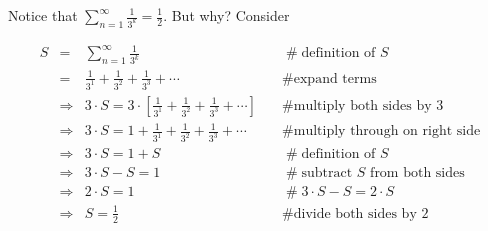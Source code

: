\documentclass[11pt, oneside]{article}   	%
\begin{document}
Notice that  $\sum\limits_{n = 1}^\infty   \frac{1}{3^k}  = \frac{1}{2}$. But why? Consider 
      
\begin{equation*}
\begin{array}{lllll}
S
&=&   \sum\limits_{n = 1}^\infty   \frac{1}{3^k}                                                                     &\quad  \mathrel{\#} \text{definition of $S$}                    \\ 
&=& \frac{1}{3^1} + \frac{1}{3^2} + \frac{1}{3^3} + \cdots                                                       &\quad  \mathrel{\#} \text{expand terms}                         \\
&\Rightarrow& 3 \cdot S = 3 \cdot [\frac{1}{3^1} + \frac{1}{3^2} + \frac{1}{3^3} + \cdots ]      &\quad  \mathrel{\#} \text{multiply both sides by 3}         \\
&\Rightarrow& 3 \cdot S = 1 + \frac{1}{3^1} + \frac{1}{3^2} + \frac{1}{3^3} + \cdots               &\quad  \mathrel{\#} \text{multiply through on right side} \\
&\Rightarrow& 3 \cdot S = 1 + S                                                                                         &\quad  \mathrel{\#} \text{definition of $S$}                      \\
&\Rightarrow& 3 \cdot S - S = 1                                                                                          &\quad  \mathrel{\#} \text{subtract $S$ from both sides}  \\
&\Rightarrow& 2 \cdot S  = 1                                                                                               &\quad  \mathrel{\#} 3 \cdot S - S = 2 \cdot S                   \\
&\Rightarrow& S  = \frac{1}{2}                                                                                             &\quad  \mathrel{\#} \text{divide both sides by 2} 
\end{array}
\end{equation*}
\end{document}
